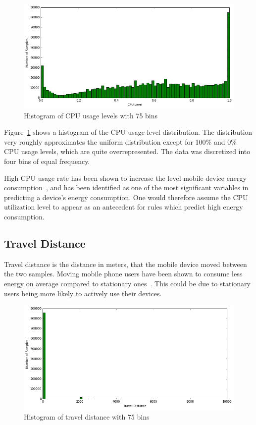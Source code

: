 \begin{figure} %
	\centering
	\includegraphics[width=\textwidth]{images/carat-data/cpu_level.png}
	\caption{Histogram of CPU usage levels with 75 bins}
	\label{figure:carat-data-cpu-level}
\end{figure}  

Figure~\ref{figure:carat-data-cpu-level} shows a histogram of the CPU usage level distribution. The distribution very roughly approximates the uniform distribution except for 100\% and 0\% CPU usage levels, which are quite overrepresented. The data was discretized into four bins of equal frequency.

High CPU usage rate has been shown to increase the level mobile device energy consumption~\cite{5375354, PELTONEN201671}, and has been identified as one of the most significant variables in predicting a device's energy consumption. One would therefore assume the CPU utilization level to appear as an antecedent for rules which predict high energy consumption.    

\subsection{Travel Distance}  

Travel distance is the distance in meters, that the mobile device moved between the two samples. Moving mobile phone users have been shown to consume less energy on average compared to stationary ones~\cite{7146507}. This could be due to stationary users being more likely to actively use their devices. 

\begin{figure} %
	\centering
	\includegraphics[width=\textwidth]{images/carat-data/travel_distance.png}
	\caption{Histogram of travel distance with 75 bins}
	\label{figure:carat-data-travel-distance}
\end{figure}  

